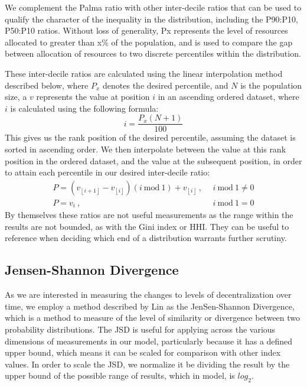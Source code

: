 \documentclass[conference]{IEEEtran}
\begin{document}
We complement the Palma ratio with other inter-decile ratios that can be used to qualify the character of the inequality in the distribution, including the P90:P10, P50:P10 ratios.  Without loss of generality, Px represents the level of resources allocated to greater than x\% of the population, and is used to compare the gap between allocation of resources to two discrete percentiles within the distribution.

These inter-decile ratios are calculated using the linear interpolation method \cite{frost2023B} described below, where $P_x$ denotes the desired percentile, and $N$ is the population size, a $v$ represents the value at position $i$ in an ascending ordered dataset, where $i$ is calculated using the following formula:
\[ i = \frac{P_x\left( N+1 \right)}{100} \]
This gives us the rank position of the desired percentile, assuming the dataset is sorted in ascending order.  We then interpolate between the value at this rank position in the ordered dataset, and the value at the subsequent position, in order to attain each percentile in our desired inter-decile ratio:
\begin{align*}
P = \left( v_{\left\lfloor i+1 \right\rfloor} - v_{\left\lfloor i \right\rfloor}\right)(i \ \text{mod} \ 1) + v_{\left\lfloor i \right\rfloor} \ , & \ \ i \ \text{mod} \ 1 \neq 0 \\
P = v_i \ , & \ \ i \ \text{mod} \ 1 = 0
\end{align*}
By themselves these ratios are not useful measurements as the range within the results are not bounded, as with the Gini index or HHI. They can be useful to reference when deciding which end of a distribution warrants further scrutiny.

\subsection{Jensen-Shannon Divergence}

As we are interested in measuring the changes to levels of decentralization over time,  we employ a method described by Lin \cite{lin1991divergence} as the JenSen-Shannon Divergence, which is a method to measure of the level of similarity or divergence between two probability distributions.  The JSD is useful for applying across the various dimensions of measurements in our model, particularly because it has a defined upper bound, which means it can be scaled for comparison with other index values.  In order to scale the JSD, we normalize it be dividing the result by the upper bound of the possible range of results, which in model, is $log_2$.
\end{document}
